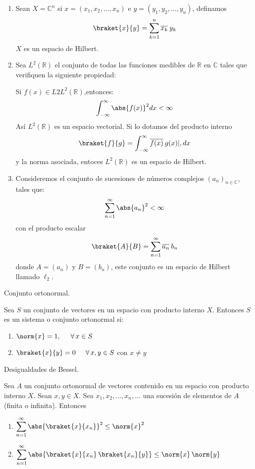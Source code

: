 \begin{enumerate}
\item Sean $X = \mathbb{C}^{n}$ si $x = (x_{1}, x_{2}, \ldots, x_{n})$ e $y = (y_{1}, y_{2}, \ldots, y_{n})$, definamos
\[ \braket{x}{y} = \sum_{k=1}^{n} \overline{x_{k}} \: y_{k} \]
$X$ es un espacio de Hilbert.
\item Sea $L^{2}(\mathbb{R})$ el conjunto de todas las funciones medibles de $\mathbb{R}$ en $\mathbb{C}$ tales que verifiquen la siguiente propiedad:

Si $f(x) \in L2 L^{2}(\mathbb{R})$,entonces:
\[ \int_{-\infty}^{\infty} \abs{f(x)}^{2} dx < \infty \]
Así $L^{2}(\mathbb{R})$ es un espacio vectorial. Si lo dotamos del producto interno
\[ \braket{f}{g} = \int_{-\infty}^{\infty} \overline{f(x)} \: g(x) |, dx \]
y la norma asociada, entoces $L^{2}(\mathbb{R})$ es un espacio de Hilbert.
\item Consideremos el conjunto de sucesiones de números complejos $(a_{n})_{n \in \mathbb{C}}$, tales que:
\[ \sum_{n=1}^{\infty} \abs{a_{n}}^{2} < \infty \]
con el producto escalar
\[ \braket{A}{B} = \sum_{n=1}^{\infty} \overline{a_{n}} \: b_{n} \]
donde $A = (a_{n})$ y $B = (b_{n})$, este conjunto es un espacio de Hilbert llamado $\ell_{2}$.
\end{enumerate}
\begin{defi} Conjunto ortonormal.

Sea $S$ un conjunto de vectores en un espacio con producto interno $X$. Entonces $S$ es un sistema o conjunto ortonormal si:
\begin{enumerate}[label=\roman*.]
\item  $\norm{x} = 1, \hspace{0.5cm} \forall \, x \in S$
\item $\braket{x}{y} = 0 \hspace{0.5cm} \forall \, x, y \in S$ con $x \neq y$
\end{enumerate}
\end{defi}
\begin{teo} Desigualdades de Bessel.
    
Sea $A$ un conjunto ortonormal de vectores contenido en un espacio con producto interno $X$. Sean $x, y \in X$. Sea ${x_{1}, x_{2}, \ldots, x_{n}, \ldots}$ una sucesión de elementos de $A$ (finita o infinita). Entonces
\begin{enumerate}[label=\roman*.]
\item $\displaystyle{\sum_{n=1}^{\infty} \abs{\braket{x}{x_{n}}}^{2} \leq \norm{x}^{2}}$
\item $\displaystyle{\sum_{n=1}^{\infty} \abs{\braket{x}{x_{n}} \, \braket{x_{n}}{y}} \leq \norm{x} \, \norm{y}}$
\end{enumerate}
\end{teo}

